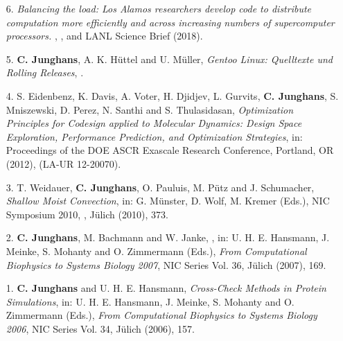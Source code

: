 \documentclass{article}
\begin{document}
\begin{enumerate}
\item[6.] \textit{Balancing the load: Los Alamos researchers develop code to distribute computation more efficiently and across increasing numbers of supercomputer processors.}
  , ,  and LANL Science Brief (2018).

\item[5.] \textbf{C. Junghans}, A. K. H{\"u}ttel and U. M{\"u}ller, 
  \textit{Gentoo Linux: Quelltexte und Rolling Releases},
  .

\item[4.] S. Eidenbenz, K. Davis, A. Voter, H. Djidjev, L. Gurvits, \textbf{C. Junghans}, S. Mniszewski, D. Perez, N. Santhi and S. Thulasidasan,
  \textit{Optimization Principles for Codesign applied to Molecular Dynamics: Design Space Exploration, Performance Prediction, and Optimization Strategies},
  in: Proceedings of the DOE ASCR Exascale Research Conference, Portland, OR (2012), (LA-UR 12-20070). 

\item[3.] T. Weidauer, \textbf{C. Junghans}, O. Pauluis, M. P{\"u}tz and J. Schumacher,
  \textit{Shallow Moist Convection},
  in: G. M{\"u}nster, D. Wolf, M. Kremer (Eds.),
  NIC Symposium 2010, , J{\"u}lich (2010), 373.

\item[2.] \textbf{C. Junghans}, M. Bachmann and W. Janke,
  \textit{},
  in: U. H. E. Hansmann, J. Meinke, S. Mohanty and O. Zimmermann (Eds.),
  \textit{From Computational Biophysics to Systems Biology 2007}, NIC Series Vol. 36, J{\"u}lich (2007), 169.

\item[1.] \textbf{C. Junghans} and U. H. E. Hansmann,
  \textit{Cross-Check Methods in Protein Simulations},
  in: U. H. E. Hansmann, J. Meinke, S. Mohanty and O. Zimmermann (Eds.),
  \textit{From Computational Biophysics to Systems Biology 2006},
  NIC Series Vol. 34, J{\"u}lich (2006), 157.
\end{enumerate}
\end{document}
